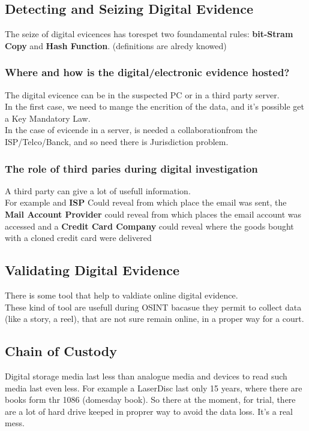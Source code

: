 \subsection{Detecting and Seizing Digital Evidence}
The seize of digital evicences has torespet two foundamental rules: \textbf{bit-Stram Copy} and 
\textbf{Hash Function}. (definitions are alredy knowed)

\subsubsection{Where and how is the digital/electronic evidence hosted?}
The digital evicence can be in the suspected PC or in a third party server. \\
In the first case, we need to mange the encrition of the data, and it's possible get a Key Mandatory Law. \\
In the case of evicende in a server, is needed a collaborationfrom the ISP/Telco/Banck, and so need there is Jurisdiction problem. 

\subsubsection{The role of third paries during digital investigation}

A third party can give a lot of usefull information. \\
For example and \textbf{ISP} Could reveal from which place the email was sent, the \textbf{Mail Account Provider} could reveal from which places the email account was accessed and a \textbf{Credit Card Company} could reveal where the goods bought with a cloned credit card were delivered

\subsection{Validating Digital Evidence}
There is some tool that help to valdiate online digital evidence. \\
These kind of tool are usefull during OSINT bacasue they permit to collect data (like a story, a reel), that are not sure remain online, in a proper way for a court.


\subsection{Chain of Custody}

Digital storage media last less than analogue media and devices to read such media last even less. For example a LaserDisc last only 15 years, where there are books form thr 1086 (domesday book). So there at the moment, for trial, there are a lot of hard drive keeped in proprer way to avoid the data loss. It's a real mess.


